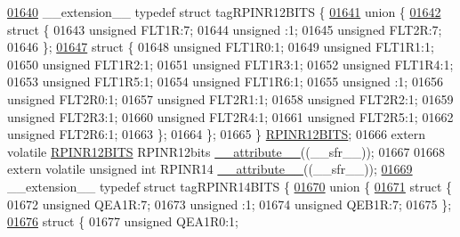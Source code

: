 \begin{DoxyCode}
\hypertarget{a00015_source_l01640}{}\hyperlink{a00014}{01640} \_\_extension\_\_ \textcolor{keyword}{typedef} \textcolor{keyword}{struct }tagRPINR12BITS \{
\hypertarget{a00015_source_l01641}{}\hyperlink{a00015}{01641}   \textcolor{keyword}{union }\{
\hypertarget{a00015_source_l01642}{}\hyperlink{a00015}{01642}     \textcolor{keyword}{struct }\{
01643       \textcolor{keywordtype}{unsigned} FLT1R:7;
01644       \textcolor{keywordtype}{unsigned} :1;
01645       \textcolor{keywordtype}{unsigned} FLT2R:7;
01646     \};
\hypertarget{a00015_source_l01647}{}\hyperlink{a00015}{01647}     \textcolor{keyword}{struct }\{
01648       \textcolor{keywordtype}{unsigned} FLT1R0:1;
01649       \textcolor{keywordtype}{unsigned} FLT1R1:1;
01650       \textcolor{keywordtype}{unsigned} FLT1R2:1;
01651       \textcolor{keywordtype}{unsigned} FLT1R3:1;
01652       \textcolor{keywordtype}{unsigned} FLT1R4:1;
01653       \textcolor{keywordtype}{unsigned} FLT1R5:1;
01654       \textcolor{keywordtype}{unsigned} FLT1R6:1;
01655       \textcolor{keywordtype}{unsigned} :1;
01656       \textcolor{keywordtype}{unsigned} FLT2R0:1;
01657       \textcolor{keywordtype}{unsigned} FLT2R1:1;
01658       \textcolor{keywordtype}{unsigned} FLT2R2:1;
01659       \textcolor{keywordtype}{unsigned} FLT2R3:1;
01660       \textcolor{keywordtype}{unsigned} FLT2R4:1;
01661       \textcolor{keywordtype}{unsigned} FLT2R5:1;
01662       \textcolor{keywordtype}{unsigned} FLT2R6:1;
01663     \};
01664   \};
01665 \} \hyperlink{a00014_d0/d15/a00700}{RPINR12BITS};
01666 \textcolor{keyword}{extern} \textcolor{keyword}{volatile} \hyperlink{a00014_d0/d15/a00700}{RPINR12BITS} RPINR12bits \hyperlink{a00015_a493c46f03454991ccc5aa7a6e1dfb2a7}{\_\_attribute\_\_}((\_\_sfr\_\_));
01667 
01668 \textcolor{keyword}{extern} \textcolor{keyword}{volatile} \textcolor{keywordtype}{unsigned} \textcolor{keywordtype}{int}  RPINR14 \hyperlink{a00015_a493c46f03454991ccc5aa7a6e1dfb2a7}{\_\_attribute\_\_}((\_\_sfr\_\_));
\hypertarget{a00015_source_l01669}{}\hyperlink{a00014}{01669} \_\_extension\_\_ \textcolor{keyword}{typedef} \textcolor{keyword}{struct }tagRPINR14BITS \{
\hypertarget{a00015_source_l01670}{}\hyperlink{a00015}{01670}   \textcolor{keyword}{union }\{
\hypertarget{a00015_source_l01671}{}\hyperlink{a00015}{01671}     \textcolor{keyword}{struct }\{
01672       \textcolor{keywordtype}{unsigned} QEA1R:7;
01673       \textcolor{keywordtype}{unsigned} :1;
01674       \textcolor{keywordtype}{unsigned} QEB1R:7;
01675     \};
\hypertarget{a00015_source_l01676}{}\hyperlink{a00015}{01676}     \textcolor{keyword}{struct }\{
01677       \textcolor{keywordtype}{unsigned} QEA1R0:1;

\end{DoxyCode}
